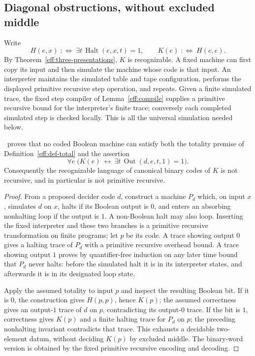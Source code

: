 \subsection{Diagonal obstructions, without excluded middle}

Write
\[
 H(e,x)\;:\!\Longleftrightarrow\;\exists t\,
 \operatorname{Halt}(e,x,t)=1,
 \qquad K(e)\;:\!\Longleftrightarrow\;H(e,e).
\]
By Theorem~\ref{eff:three-presentations}, $K$ is recognizable.  A fixed
machine can first copy its input and then simulate the machine whose code
is that input.  An interpreter maintains the simulated table and tape
configuration, performs the displayed primitive recursive step operation,
and repeats.  Given a finite simulated trace, the fixed step compiler of
Lemma~\ref{eff:compile} supplies a primitive recursive bound for the
interpreter's finite trace; conversely each completed simulated step is
checked locally.  This is all the universal simulation needed below.

\begin{theorem}
\label{eff:halting}
\ipra\ proves that no coded Boolean machine can satisfy both the totality
premise of Definition~\ref{eff:def-total} and the assertion
\[
 \forall e\;\bigl(K(e)\ \longleftrightarrow\
       \exists t\,\operatorname{Out}(d,e,t,1)=1\bigr).
\]
Consequently the recognizable language of canonical binary codes of $K$
is not recursive, and in particular is not primitive recursive.
\end{theorem}
\begin{proof}
From a proposed decider code $d$, construct a machine $P_d$ which, on input
$x$, simulates $d$ on $x$, halts if its Boolean output is $0$, and enters
an absorbing nonhalting loop if the output is $1$.  A non-Boolean halt may
also loop.  Inserting the fixed interpreter and these two branches is a
primitive recursive transformation on finite programs; let $p$ be its
code.  A trace showing output $0$ gives a halting trace of $P_d$ with a
primitive recursive overhead bound.  A trace showing output $1$ proves
by quantifier-free induction on any later time bound that $P_d$ never
halts: before the simulated halt it is in its interpreter states, and
afterwards it is in its designated loop state.

Apply the assumed totality to input $p$ and inspect the resulting Boolean
bit.  If it is $0$, the construction gives $H(p,p)$, hence $K(p)$; the
assumed correctness gives an output-$1$ trace of $d$ on $p$, contradicting
its output-$0$ trace.  If the bit is $1$, correctness gives $K(p)$ and a
finite halting trace for $P_d$ on $p$; the preceding nonhalting invariant
contradicts that trace.  This exhausts a decidable two-element datum,
without deciding $K(p)$ by excluded middle.  The binary-word version is
obtained by the fixed primitive recursive encoding and decoding.
\end{proof}

